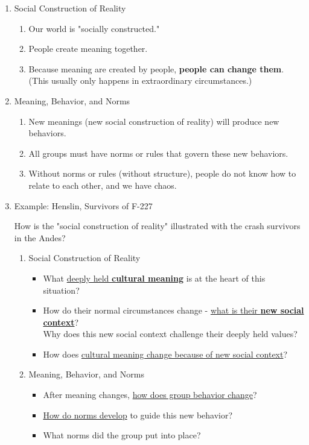 \documentclass[12pt,a4paper]{article}
\begin{document}
\begin{enumerate}
\begin{eg}{ }
\begin{enumerate}
\begin{enumerate}
			\end{enumerate}
		\end{enumerate}
	\end{eg}
	\item Social Construction of Reality
	\begin{enumerate}
		\item Our world is "socially constructed."
		\item People create meaning together. 
		\item Because meaning are created by people, \textbf{people can change them}. (This usually only happens in extraordinary circumstances.)
	\end{enumerate}
	\item Meaning, Behavior, and Norms
	\begin{enumerate}
		\item New meanings (new social construction of reality) will produce new behaviors.
		\item All groups must have norms or rules that govern these new behaviors.
		\item Without norms or rules (without structure), people do not know how to relate to each other, and we have chaos. 	
	\end{enumerate}
	\item Example: Henslin, Survivors of F-227
	\begin{eg}{How is the "social construction of reality" illustrated with the crash survivors in the Andes? }
		\begin{enumerate}
			\item Social Construction of Reality
			\begin{itemize}
				\item What \underline{deeply held \textbf{cultural meaning}} is at the heart of this situation? 
				\item How do their normal circumstances change - \underline{what is their \textbf{new social context}}? \\
					Why does this new social context challenge their deeply held values? 
				\item How does \underline{cultural meaning change because of new social context}?
			\end{itemize}
			\item Meaning, Behavior, and Norms
			\begin{itemize}
				\item After meaning changes, \underline{how does group behavior change}?
				\item \underline{How do norms develop} to guide this new behavior? 
				\item What norms did the group put into place? 
			\end{itemize}
		\end{enumerate}	
	\end{eg}

\end{enumerate}
\end{document}
